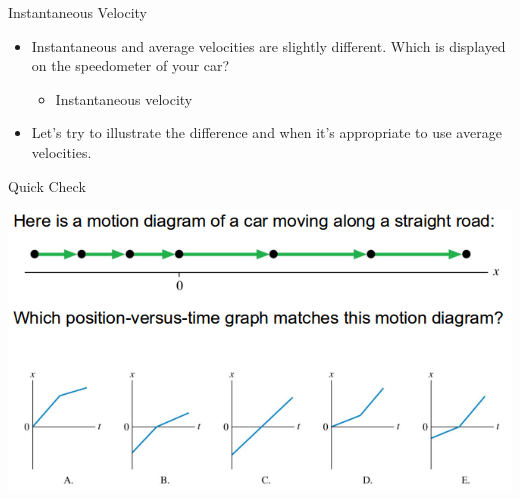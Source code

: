 \documentclass{beamer}
\newcommand{\red}[1]{{\color{red}{#1}}}
\newcommand{\checkh}[2]{\begin{textblock*}{1cm}(#1,#2){\huge \red{\Checkmark}}\end{textblock*}}
\begin{document}
\begin{frame}{Instantaneous Velocity}
\begin{itemize}
   \item<1-> Instantaneous and average velocities are slightly different. Which is displayed on the speedometer of your car?
   \begin{itemize}
      \item<2-> Instantaneous velocity
   \end{itemize}
   \item<3-> Let's try to illustrate the difference and when it's appropriate to use average velocities.
\end{itemize}
\begin{center}
\end{center}
\end{frame}

\begin{frame}{Quick Check}
\begin{center}
   \includegraphics[width=\textwidth]{../figures/QC2_3.png}
\end{center}
\only<2->{\checkh{10.7cm}{7.2cm}}
\end{frame}
\end{document}
